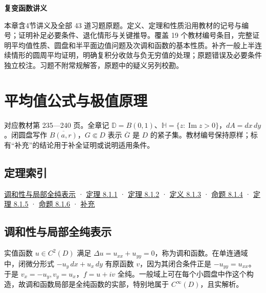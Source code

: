 \documentclass[11pt,a4paper]{article}
\begin{document}
\begin{center}
{\LARGE\bfseries 复变函数讲义\par}
\vspace{8pt}{\large 第八章\quad 调和函数与次调和函数\par}
\vspace{6pt}{\small 依史济怀、刘太顺《复变函数》\quad 教材第 235—252 页\par}
\end{center}\vspace{8pt}
本章含4节讲义及全部 43 道习题原题。定义、定理和性质沿用教材的记号与编号；证明补足必要条件、退化情形与关键推导。覆盖 19 个教材编号条目，完整证明平均值性质、圆盘和半平面边值问题及次调和函数的基本性质。补齐一般上半连续情形的圆周平均证明，明确复积分收敛与负无穷值的处理；原题错误及必要条件独立校注。习题不附常规解答，原题中的疑义另列校勘。
\begingroup\setlength{\parskip}{0pt}\tableofcontents\endgroup\clearpage
\section{平均值公式与极值原理}
对应教材第 235---240 页。全章记
\(\mathbb D=B(0,1)\)、\(\mathbb H=\{z:\operatorname{Im}z>0\}\)，\(dA=dx\,dy\)。闭圆盘写作
\(\overline{B(a,r)}\)，\(G\Subset D\) 表示 \(\overline G\) 是 \(D\)
的紧子集。教材编号保持原样；标有``补充''的结论用于补全证明或说明适用条件。

\subsection*{定理索引}\label{ch08-s1-heading-1}

\hyperref[ch08-s1-heading-2]{调和性与局部全纯表示} · \hyperref[ch08-s1-heading-3]{定理
8.1.1} · \hyperref[ch08-s1-heading-4]{定理 8.1.2} · \hyperref[ch08-s1-heading-5]{定义
8.1.3} · \hyperref[ch08-s1-heading-6]{命题 8.1.4} · \hyperref[ch08-s1-heading-7]{定理
8.1.5} · \hyperref[ch08-s1-heading-8]{命题 8.1.6} · \hyperref[ch08-s1-heading-9]{补充}

\subsection*{调和性与局部全纯表示}\label{ch08-s1-heading-2}

实值函数 \(u\in C^2(D)\) 满足
\(\Delta u=u_{xx}+u_{yy}=0\)，称为调和函数。在单连通域中，闭微分形式
\(-u_y\,dx+u_x\,dy\) 有原函数 \(v\)，因为其闭合条件正是
\(-u_{yy}=u_{xx}\)。于是 \(v_x=-u_y,v_y=u_x\)，\(f=u+iv\)
全纯。一般域上可在每个小圆盘中作这个构造，故调和函数局部是全纯函数的实部，特别地属于
\(C^\infty(D)\)，且实解析。
\end{document}
